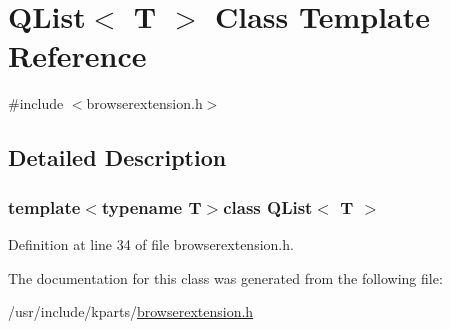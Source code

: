 \hypertarget{classQList}{\section{Q\+List$<$ T $>$ Class Template Reference}
\label{classQList}
}


{\ttfamily \#include $<$browserextension.\+h$>$}



\subsection{Detailed Description}
\subsubsection*{template$<$typename T$>$class Q\+List$<$ T $>$}



Definition at line 34 of file browserextension.\+h.



The documentation for this class was generated from the following file\+:\begin{DoxyCompactItemize}
\item 
/usr/include/kparts/\hyperlink{browserextension_8h}{browserextension.\+h}\end{DoxyCompactItemize}
